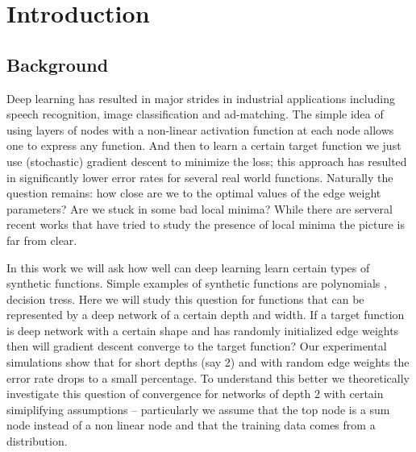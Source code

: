 \section{Introduction}

\subsection{Background}

Deep learning has resulted in major strides in industrial applications including speech recognition, image classification and ad-matching. The simple idea of using layers of nodes with a non-linear activation function at each node allows one to express any function.  And then to learn a certain target function we just use (stochastic) gradient descent to minimize the loss; this approach has resulted in significantly lower error rates for several real world functions. Naturally the question remains: how close are we to the optimal  values of the edge weight parameters? Are we stuck in some bad local minima? While there are serveral recent works \cite{} that have tried to study the presence of local minima the picture is far from clear.

In this work we will ask how well can deep learning learn certain types of synthetic functions. Simple examples of synthetic functions are polynomials \cite{}, decision tress. Here we will study this question for functions that can be represented by a deep network of a certain depth and width. If a target function is deep network with a certain shape and has randomly initialized edge weights then will gradient descent converge to the target function? Our experimental simulations show that for short depths (say 2) and with random edge weights the error rate drops to a small percentage.  To understand this better we theoretically investigate this question of convergence for networks of depth $2$ with certain simiplifying assumptions -- particularly we assume that the top node is a sum node instead of a non linear node and that the training data comes from a distribution. 

